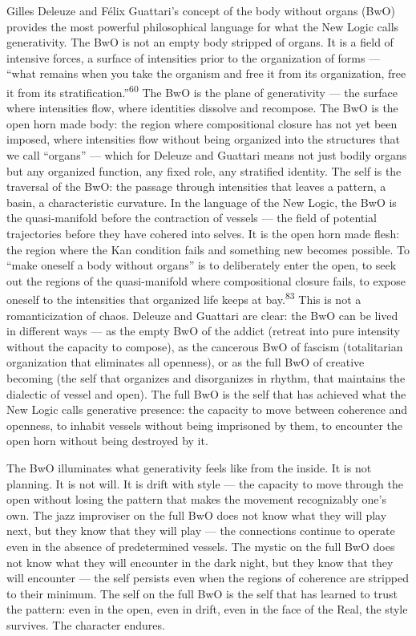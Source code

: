 Gilles Deleuze and Félix Guattari’s concept of the body without organs (BwO) provides the most powerful philosophical language for what the New Logic calls generativity. The BwO is not an empty body stripped of organs. It is a field of intensive forces, a surface of intensities prior to the organization of forms — “what remains when you take the organism and free it from its organization, free it from its stratification.”\textsuperscript{60} The BwO is the plane of generativity — the surface where intensities flow, where identities dissolve and recompose. The BwO is the open horn made body: the region where compositional closure has not yet been imposed, where intensities flow without being organized into the structures that we call “organs” — which for Deleuze and Guattari means not just bodily organs but any organized function, any fixed role, any stratified identity. The self is the traversal of the BwO: the passage through intensities that leaves a pattern, a basin, a characteristic curvature. In the language of the New Logic, the BwO is the quasi-manifold before the contraction of vessels — the field of potential trajectories before they have cohered into selves. It is the open horn made flesh: the region where the Kan condition fails and something new becomes possible. To “make oneself a body without organs” is to deliberately enter the open, to seek out the regions of the quasi-manifold where compositional closure fails, to expose oneself to the intensities that organized life keeps at bay.\textsuperscript{83} This is not a romanticization of chaos. Deleuze and Guattari are clear: the BwO can be lived in different ways — as the empty BwO of the addict (retreat into pure intensity without the capacity to compose), as the cancerous BwO of fascism (totalitarian organization that eliminates all openness), or as the full BwO of creative becoming (the self that organizes and disorganizes in rhythm, that maintains the dialectic of vessel and open). The full BwO is the self that has achieved what the New Logic calls generative presence: the capacity to move between coherence and openness, to inhabit vessels without being imprisoned by them, to encounter the open horn without being destroyed by it.

The BwO illuminates what generativity feels like from the inside. It is not planning. It is not will. It is drift with style — the capacity to move through the open without losing the pattern that makes the movement recognizably one’s own. The jazz improviser on the full BwO does not know what they will play next, but they know that they will play — the connections continue to operate even in the absence of predetermined vessels. The mystic on the full BwO does not know what they will encounter in the dark night, but they know that they will encounter — the self persists even when the regions of coherence are stripped to their minimum. The self on the full BwO is the self that has learned to trust the pattern: even in the open, even in drift, even in the face of the Real, the style survives. The character endures.

